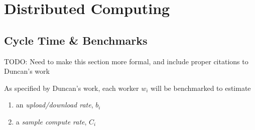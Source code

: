 \documentclass[../mthe-493-final-project.tex]{subfiles}
\begin{document}


    
    \section{Distributed Computing}
    \label{sec:distributed-computing-implementation}

    
    \subsection{Cycle Time \& Benchmarks}
    \label{ssec:cycle-time-and-benchmarks}

    TODO: Need to make this section more formal, and include proper citations to Duncan's work

    As specified by Duncan's work, each worker $w_i$ will be benchmarked to estimate

    \begin{enumerate}
        \item an \textit{upload/download rate}, $b_i$
        \item a \textit{sample compute rate}, $C_i$
    \end{enumerate}
\end{document}
